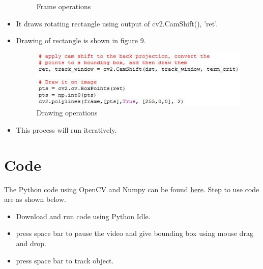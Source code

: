 \documentclass[11pt,a4paper]{article}
\begin{document}
\begin{itemize}
\begin{figure}
					\centering
					\caption{Frame operations}
				\end{figure}
				\newpage
				\item It draws rotating rectangle using output of cv2.CamShift(), 'ret'.
				\item Drawing of rectangle is shown in figure 9.
				\begin{figure}
					\includegraphics[scale=0.8 ]{../Images/drawing_code.JPG}
					\centering
					\caption{Drawing operations}
				\end{figure}
				\item This process will run iteratively.
			\end{itemize}
	\section{Code}
		The Python code using OpenCV and Numpy can be found \href{../Code}{here}.
		Step to use code are as shown below.
		\begin{itemize}
			\item Download and run code using Python Idle.
			\item press space bar to pause the video and give bounding box using mouse drag and drop.
			\item press space bar to track object.
		\end{itemize}
	
\end{document}
